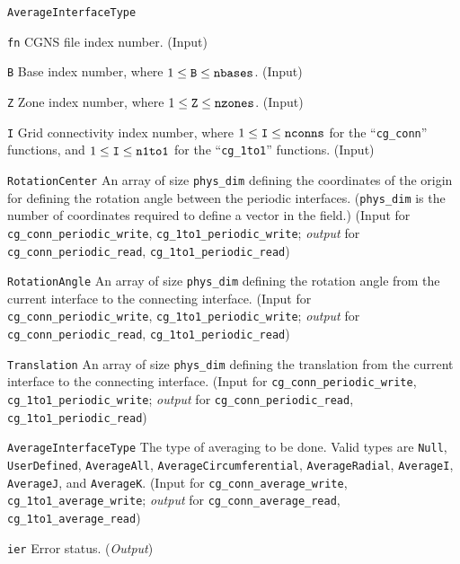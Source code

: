 \begin{Ventryi}{\texttt{AverageInterfaceType}}\raggedright
\item [\texttt{fn}]
      CGNS file index number.
      (\textcolor{input}{Input})
\item [\texttt{B}]
      Base index number, where $1 \leq \text{\texttt{B}} \leq \text{\texttt{nbases}}$.
      (\textcolor{input}{Input})
\item [\texttt{Z}]
      Zone index number, where $1 \leq \text{\texttt{Z}} \leq \text{\texttt{nzones}}$.
      (\textcolor{input}{Input})
\item [\texttt{I}]
      Grid connectivity index number, where
      $1 \leq \text{\texttt{I}} \leq \text{\texttt{nconns}}$
      for the ``\texttt{cg\_conn}'' functions, and
      $1 \leq \text{\texttt{I}} \leq \text{\texttt{n1to1}}$
      for the ``\texttt{cg\_1to1}'' functions.
      (\textcolor{input}{Input})
\item [\texttt{RotationCenter}]
      An array of size \texttt{phys\_dim} defining the coordinates of
      the origin for defining the rotation angle between the periodic
      interfaces.
      (\texttt{phys\_dim} is the number of coordinates required to define
      a vector in the field.)
      (\textcolor{input}{Input} for \texttt{cg\_conn\_periodic\_write},
      \texttt{cg\_1to1\_periodic\_write};
      \textcolor{output}{\textit{output}} for \texttt{cg\_conn\_periodic\_read},
      \texttt{cg\_1to1\_periodic\_read})
\item [\texttt{RotationAngle}]
      An array of size \texttt{phys\_dim} defining the rotation angle from
      the current interface to the connecting interface.
      (\textcolor{input}{Input} for \texttt{cg\_conn\_periodic\_write},
      \texttt{cg\_1to1\_periodic\_write};
      \textcolor{output}{\textit{output}} for \texttt{cg\_conn\_periodic\_read},
      \texttt{cg\_1to1\_periodic\_read})
\item [\texttt{Translation}]
      An array of size \texttt{phys\_dim} defining the translation from
      the current interface to the connecting interface.
      (\textcolor{input}{Input} for \texttt{cg\_conn\_periodic\_write},
      \texttt{cg\_1to1\_periodic\_write};
      \textcolor{output}{\textit{output}} for \texttt{cg\_conn\_periodic\_read},
      \texttt{cg\_1to1\_periodic\_read})
\item [\texttt{AverageInterfaceType}]
      The type of averaging to be done.
      Valid types are \texttt{Null}, \texttt{UserDefined}, \texttt{AverageAll},
      \texttt{AverageCircumferential}, \texttt{AverageRadial}, \texttt{AverageI},
      \texttt{AverageJ}, and \texttt{AverageK}.
      (\textcolor{input}{Input} for \texttt{cg\_conn\_average\_write},
      \texttt{cg\_1to1\_average\_write};
      \textcolor{output}{\textit{output}} for \texttt{cg\_conn\_average\_read},
      \texttt{cg\_1to1\_average\_read})
\item [\texttt{ier}]
      Error status.
      (\textcolor{output}{\textit{Output}})
\end{Ventryi}

